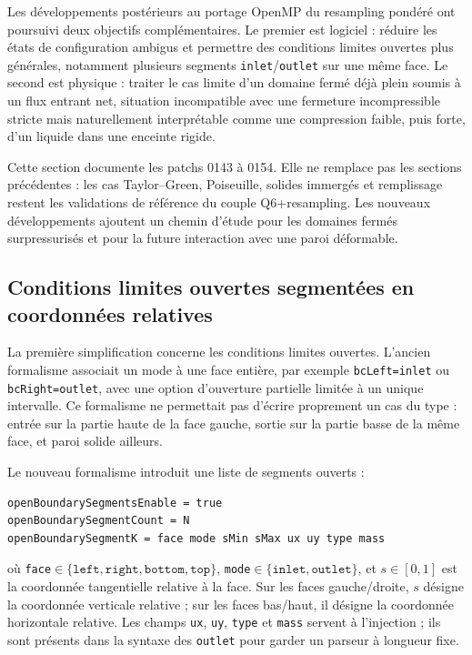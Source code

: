 \documentclass[11pt,a4paper]{article}
\begin{document}
Les développements postérieurs au portage OpenMP du resampling pondéré ont poursuivi deux objectifs complémentaires. Le premier est logiciel : réduire les états de configuration ambigus et permettre des conditions limites ouvertes plus générales, notamment plusieurs segments \texttt{inlet}/\texttt{outlet} sur une même face. Le second est physique : traiter le cas limite d'un domaine fermé déjà plein soumis à un flux entrant net, situation incompatible avec une fermeture incompressible stricte mais naturellement interprétable comme une compression faible, puis forte, d'un liquide dans une enceinte rigide.

Cette section documente les patchs 0143 à 0154. Elle ne remplace pas les sections précédentes : les cas Taylor--Green, Poiseuille, solides immergés et remplissage restent les validations de référence du couple Q6+resampling. Les nouveaux développements ajoutent un chemin d'étude pour les domaines fermés surpressurisés et pour la future interaction avec une paroi déformable.

\subsection{Conditions limites ouvertes segmentées en coordonnées relatives}

La première simplification concerne les conditions limites ouvertes. L'ancien formalisme associait un mode à une face entière, par exemple \texttt{bcLeft=inlet} ou \texttt{bcRight=outlet}, avec une option d'ouverture partielle limitée à un unique intervalle. Ce formalisme ne permettait pas d'écrire proprement un cas du type : entrée sur la partie haute de la face gauche, sortie sur la partie basse de la même face, et paroi solide ailleurs.

Le nouveau formalisme introduit une liste de segments ouverts :
\begin{verbatim}
openBoundarySegmentsEnable = true
openBoundarySegmentCount = N
openBoundarySegmentK = face mode sMin sMax ux uy type mass
\end{verbatim}
où \texttt{face}\(\in\{\texttt{left},\texttt{right},\texttt{bottom},\texttt{top}\}\), \texttt{mode}\(\in\{\texttt{inlet},\texttt{outlet}\}\), et \(s\in[0,1]\) est la coordonnée tangentielle relative à la face. Sur les faces gauche/droite, \(s\) désigne la coordonnée verticale relative ; sur les faces bas/haut, il désigne la coordonnée horizontale relative. Les champs \texttt{ux}, \texttt{uy}, \texttt{type} et \texttt{mass} servent à l'injection ; ils sont présents dans la syntaxe des \texttt{outlet} pour garder un parseur à longueur fixe.
\end{document}

